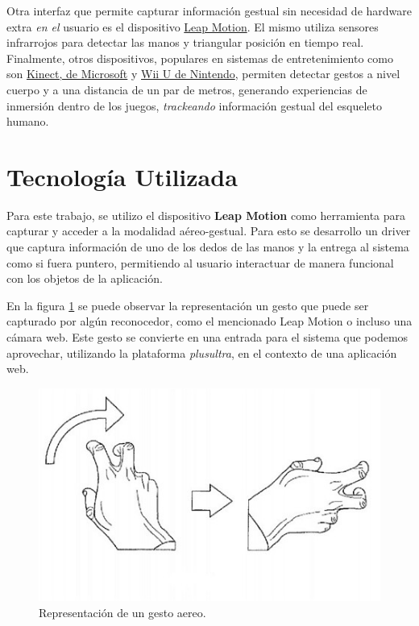 Otra interfaz que permite capturar información gestual sin necesidad de hardware extra \emph{en el} usuario es el dispositivo \href{https://www.leapmotion.com/}{ Leap Motion}. El mismo utiliza sensores infrarrojos para detectar las manos y triangular posición en tiempo real.
Finalmente, otros dispositivos, populares en sistemas de entretenimiento como son \href{http://www.xbox.com/es-ES/Kinect}{ Kinect, de Microsoft} y \href{http://www.nintendo.com/es_LA/wiiu}{ Wii U de Nintendo}, permiten detectar gestos a nivel cuerpo y a una distancia de un par de metros, generando experiencias de inmersión dentro de los juegos, \emph{trackeando} información gestual del esqueleto humano.

\section{Tecnología Utilizada}
Para este trabajo, se utilizo el dispositivo \textbf{Leap Motion} como herramienta para capturar y acceder a la modalidad aéreo-gestual. Para esto se desarrollo un driver que captura información de uno de los dedos de las manos y la entrega al sistema como si fuera puntero, permitiendo al usuario interactuar de manera funcional con los objetos de la aplicación.

En la figura \ref{fig:apx_airgesture} se puede observar la representación un gesto que puede ser capturado por algún reconocedor, como el mencionado Leap Motion o incluso una cámara web. Este gesto se convierte en una entrada para el sistema que podemos aprovechar, utilizando la plataforma \emph{plusultra}, en el contexto de una aplicación web.

\begin{center}
  \begin{figure}[h]
    \includegraphics[scale=1,width=\textwidth]{gfx/air-gestures}
    \caption{Representación de un gesto aereo.}
    \label{fig:apx_airgesture}
  \end{figure}
\end{center}

